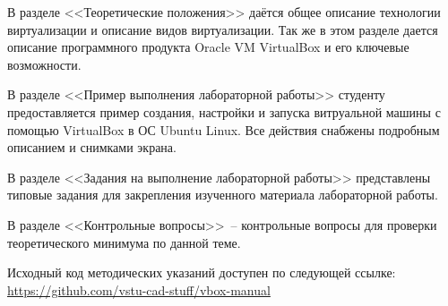 \documentclass[a4paper, 14pt]{extreport}
\begin{document}
    В разделе <<Теоретические положения>> даётся общее описание технологии
    виртуализации и описание видов виртуализации. Так же в этом разделе дается
    описание программного продукта Oracle VM VirtualBox и его ключевые
    возможности.

    В разделе <<Пример выполнения лабораторной работы>> студенту
    предоставляется пример создания, настройки и запуска витруальной машины
    с помощью VirtualBox в ОС Ubuntu Linux. Все действия снабжены подробным
    описанием и снимками экрана.

    В разделе <<Задания на выполнение лабораторной работы>> представлены
    типовые задания для закрепления изученного материала лабораторной работы.

    В разделе <<Контрольные вопросы>>~-- контрольные вопросы для проверки
    теоретического минимума по данной теме.
    
    Исходный код методических указаний доступен по следующей ссылке:\\
    \url{https://github.com/vstu-cad-stuff/vbox-manual}
\end{document}
